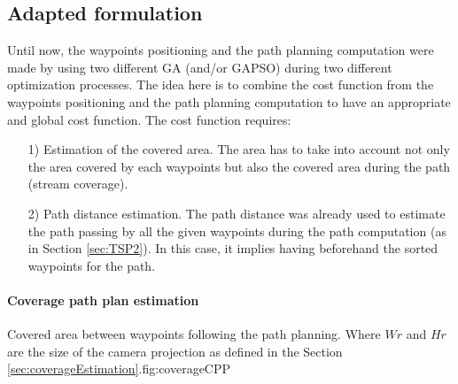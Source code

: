 		\subsection{Adapted formulation }
Until now, the waypoints positioning and the path planning computation were made by using two different GA (and/or GAPSO) during two different optimization processes. The idea here is to combine the cost function from the waypoints positioning and the path planning computation to have an appropriate and global cost function.
The cost function requires:
\begin{itemize}
	\item[1)] Estimation of the covered area. The area has to take into account not only the area covered by each waypoints but also the covered area during the path (stream coverage).%
	\item[2)] Path distance estimation. The path distance was already used to estimate the path passing  by all the given waypoints during the path computation (as in Section \ref{sec:TSP2}). In this case, it implies having beforehand the sorted waypoints for the path.
\end{itemize}

\paragraph*{Coverage path plan estimation}\label{par:CPPestimation}

  \begin{mfigures}[!]{Covered area between waypoints following the path planning. Where $Wr$ and $Hr$ are the size of the camera projection  as defined in the Section \ref{sec:coverageEstimation}.}{fig:coverageCPP} \centering

\end{mfigures}  



